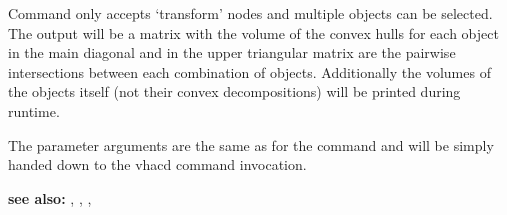 \documentclass[letterpaper,10pt,english]{sphinxmanual}
\begin{document}
Command only accepts `transform' nodes and multiple objects can be selected. The output will be a matrix with the volume of the convex hulls for each object in the main diagonal and in the upper triangular matrix are the pairwise intersections between each combination of objects. Additionally the volumes of the objects itself (not their convex decompositions) will be printed during runtime.

The parameter arguments are the same as for the command {\hyperref[pk_src.vhacd:vhacd]{}} and will be simply handed down to the vhacd command invocation.

\textbf{see also:} {\hyperref[pk_src.collision_tet_tet:collision\string-tet\string-tet]{}}, {\hyperref[pk_src.intersection_tet_tet:intersection\string-tet\string-tet]{}}, {\hyperref[pk_src.getVolume:getvolume]{}}, {\hyperref[pk_src.vhacd:vhacd]{}}
\end{document}
